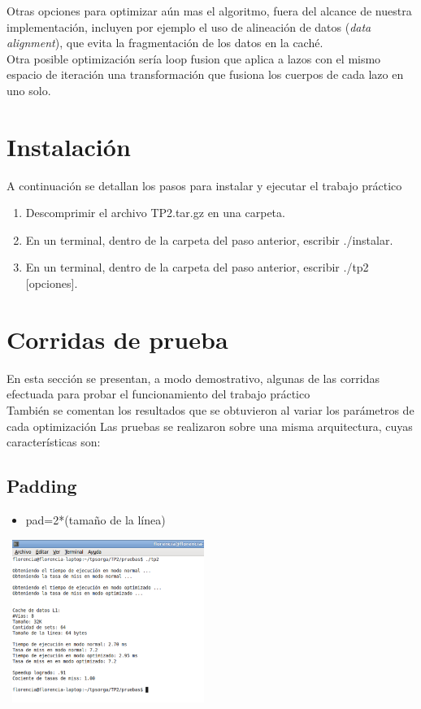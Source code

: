 \documentclass[a4paper,10pt]{article}
\begin{document}
Otras opciones para optimizar a\'un mas el algoritmo, fuera del alcance de nuestra implementaci\'on, incluyen por ejemplo el uso de alineaci\'on de datos (\textit{data alignment}), que evita la fragmentaci\'on de los datos en la cach\'e.\\
Otra posible optimizaci\'on ser\'ia loop fusion que aplica a lazos con el mismo espacio de iteraci\'on una transformaci\'on que fusiona los cuerpos de cada lazo en uno solo.


\section{Instalaci\'on}
A continuaci\'on se detallan los pasos para instalar y ejecutar el trabajo pr\'actico
\begin{enumerate}
 \item Descomprimir el archivo TP2.tar.gz en una carpeta.
\item 
En un terminal, dentro de la carpeta del paso anterior, escribir ./instalar.
\item 
En un terminal, dentro de la carpeta del paso anterior, escribir ./tp2 [opciones].
\end{enumerate}





\section{Corridas de prueba}

En esta secci\'on se presentan, a modo demostrativo, algunas de las corridas efectuada para probar el funcionamiento del trabajo pr\'actico\\
Tambi\'en se comentan los resultados que se obtuvieron al variar los par\'ametros de cada optimizaci\'on
Las pruebas se realizaron sobre una misma arquitectura, cuyas caracter\'isticas son:

\subsection*{Padding}
\begin{itemize}
\item pad=2*(tama\~no de la l\'inea)\end{itemize}

\begin{center}
 \includegraphics[width=250px,height=200px,bb=0 0 328 277,scale=1]{./ssh1.png}
\end{center}
\end{document}
